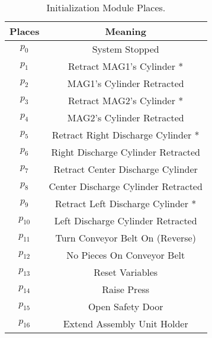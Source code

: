 \begin{table}[htbp]
\caption{Initialization Module Places.}
\centering
\begin{tabular}{cc}
\hline
Places & Meaning\\
\hline
\hyperlink{partialNet:p0}{\hypertarget{partialTable:p0m1}{$p_{0}$}} & System Stopped\\
\hyperlink{partialNet:p1}{\hypertarget{partialTable:p1}{$p_{1}$}} & Retract MAG1's Cylinder *\\
\hyperlink{partialNet:p2}{\hypertarget{partialTable:p2}{$p_{2}$}} & MAG1's Cylinder Retracted\\
\hyperlink{partialNet:p3}{\hypertarget{partialTable:p3}{$p_{3}$}} & Retract MAG2's Cylinder *\\
\hyperlink{partialNet:p4}{\hypertarget{partialTable:p4}{$p_{4}$}} & MAG2's Cylinder Retracted\\
\hyperlink{partialNet:p5}{\hypertarget{partialTable:p5}{$p_{5}$}} & Retract Right Discharge Cylinder *\\
\hyperlink{partialNet:p6}{\hypertarget{partialTable:p6}{$p_{6}$}} & Right Discharge Cylinder Retracted\\
\hyperlink{partialNet:p7}{\hypertarget{partialTable:p7}{$p_{7}$}} & Retract Center Discharge Cylinder\\
\hyperlink{partialNet:p8}{\hypertarget{partialTable:p8}{$p_{8}$}} & Center Discharge Cylinder Retracted\\
\hyperlink{partialNet:p9}{\hypertarget{partialTable:p9}{$p_{9}$}} & Retract Left Discharge Cylinder *\\
\hyperlink{partialNet:p10}{\hypertarget{partialTable:p10}{$p_{10}$}} & Left Discharge Cylinder Retracted\\
\hyperlink{partialNet:p11}{\hypertarget{partialTable:p11}{$p_{11}$}} & Turn Conveyor Belt On (Reverse)\\
\hyperlink{partialNet:p12}{\hypertarget{partialTable:p12}{$p_{12}$}} & No Pieces On Conveyor Belt\\
\hyperlink{partialNet:p13}{\hypertarget{partialTable:p13}{$p_{13}$}} & Reset Variables\footnotemark\\
\hyperlink{partialNet:p14}{\hypertarget{partialTable:p14}{$p_{14}$}} & Raise Press\\
\hyperlink{partialNet:p15}{\hypertarget{partialTable:p15}{$p_{15}$}} & Open Safety Door\\
\hyperlink{partialNet:p16}{\hypertarget{partialTable:p16}{$p_{16}$}} & Extend Assembly Unit Holder\\

\end{tabular}
\end{table}
